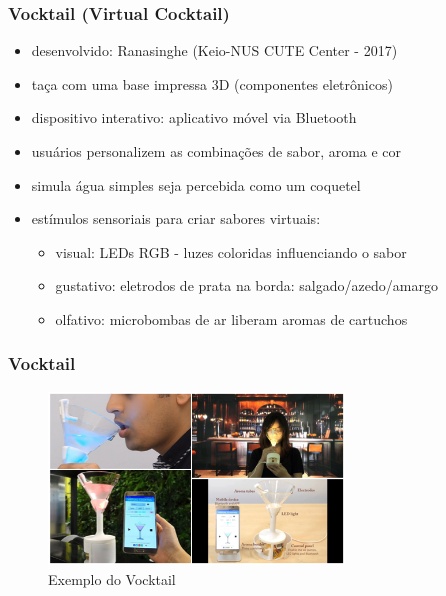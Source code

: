 \documentclass{beamer}
\begin{document}
\begin{frame}
  \frametitle{Vocktail (Virtual Cocktail)}
  \begin{itemize}
    \item desenvolvido: Ranasinghe (Keio-NUS CUTE Center - 2017)
    \item taça com uma base impressa 3D (componentes eletrônicos)
    \item dispositivo interativo: aplicativo móvel via Bluetooth
    \item usuários personalizem as combinações de sabor, aroma e cor
    \item simula água simples seja percebida como um coquetel
    \item estímulos sensoriais para criar sabores virtuais:
    \begin{itemize}
      \item visual: LEDs RGB - luzes coloridas influenciando o sabor
      \item gustativo: eletrodos de prata na borda: salgado/azedo/amargo
      \item olfativo: microbombas de ar liberam aromas de cartuchos
    \end{itemize}
  \end{itemize}
\end{frame}

\begin{frame}
  \frametitle{Vocktail}
  \begin{figure}[h]
    \centering
    \caption{Exemplo do Vocktail}
    \vspace{-8pt}
    \includegraphics[width=0.7\textwidth]{../Vocktail.png}
  \end{figure}
\end{frame}
\end{document}
